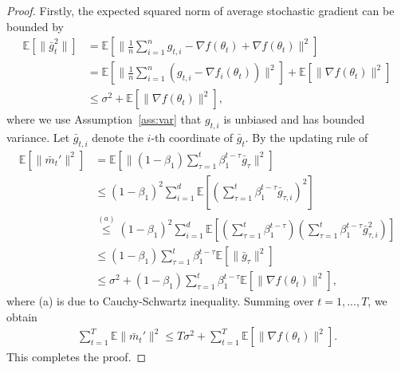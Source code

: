 \documentclass[11pt]{article}
\begin{document}
\begin{proof}
Firstly, the expected squared norm of average stochastic gradient can be bounded by
\begin{align*}
    \mathbb E[\|\bar g_t^2\|]&=\mathbb E[\|\frac{1}{n}\sum_{i=1}^n g_{t,i}-\nabla f(\theta_t)+\nabla f(\theta_t)\|^2]\\
    &=\mathbb E[\|\frac{1}{n}\sum_{i=1}^n (g_{t,i}-\nabla f_i(\theta_t))\|^2]+\mathbb E[\|\nabla f(\theta_t)\|^2]\\
    &\leq \sigma^2+\mathbb E[\|\nabla f(\theta_t)\|^2],
\end{align*}
where we use Assumption~\ref{ass:var} that $g_{t,i}$ is unbiased and has bounded variance. Let $\bar g_{t,i}$ denote the $i$-th coordinate of $\bar g_t$. By the updating rule of \algo\ 
\begin{align*}
    \mathbb E[\|\bar m_t'\|^2]&=\mathbb E[\|(1-\beta_1)\sum_{\tau=1}^t\beta_1^{t-\tau} \bar g_\tau\|^2]\\
    &\leq (1-\beta_1)^2\sum_{i=1}^d \mathbb E[(\sum_{\tau=1}^t\beta_1^{t-\tau} \bar g_{\tau,i})^2]\\
    &\overset{(a)}{\leq} (1-\beta_1)^2\sum_{i=1}^d \mathbb E[(\sum_{\tau=1}^t\beta_1^{t-\tau})(\sum_{\tau=1}^t\beta_1^{t-\tau} \bar g_{\tau,i}^2)]\\
    &\leq (1-\beta_1)\sum_{\tau=1}^t \beta_1^{t-\tau}\mathbb E[\|\bar g_\tau\|^2]\\
    &\leq \sigma^2+(1-\beta_1)\sum_{\tau=1}^t \beta_1^{t-\tau}\mathbb E[\|\nabla f(\theta_t)\|^2],
\end{align*}
where (a) is due to Cauchy-Schwartz inequality. Summing over $t=1,...,T$, we obtain
\begin{align*}
    \sum_{t=1}^T\mathbb E\|\bar m_t'\|^2\leq T\sigma^2+\sum_{t=1}^T \mathbb E[\|\nabla f(\theta_t)\|^2].
\end{align*}
This completes the proof.

\end{proof}


\end{document}
